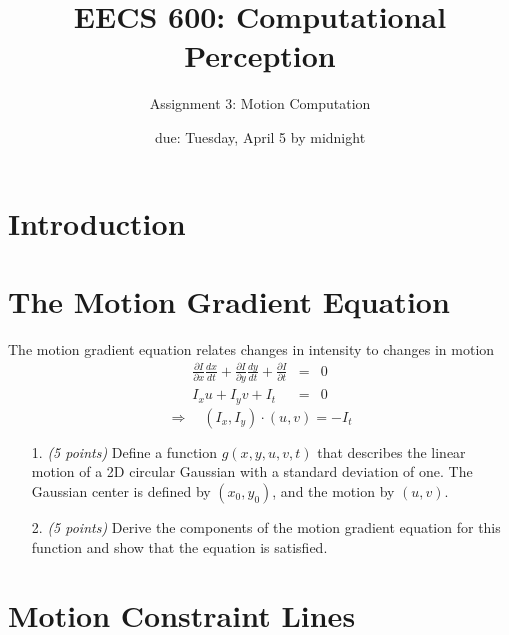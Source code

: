 \documentclass[11pt]{article}
\begin{document}
\title{EECS 600: Computational Perception}
\author{\Large Assignment 3: Motion Computation}

\date{due: Tuesday, April 5 by midnight}

\maketitle

\section*{Introduction}


\section{The Motion Gradient Equation}

\newcommand{\fdxdy}[2]{\frac{\partial #1}{\partial #2}}

The motion gradient equation relates changes in intensity to changes in motion
\begin{eqnarray*}
\fdxdy{I}{x}\frac{dx}{dt} + 
\fdxdy{I}{y}\frac{dy}{dt} + 
\fdxdy{I}{t} & = & 0\\
I_x u + I_y v + I_t & = & 0
\end{eqnarray*}
\begin{equation}
\Rightarrow \quad (I_x, I_y) \cdot (u,v) = -I_t
\end{equation}

\begin{itemize}
\item[1.] \emph{(5 points)} Define a function $g(x,y,u,v,t)$ that describes the linear motion of a 2D circular Gaussian with a standard deviation of one.  The Gaussian center is defined by $(x_0,y_0)$, and the motion by $(u,v)$.

\item[2.] \emph{(5 points)} Derive the components of the motion gradient equation for this function and show that the equation is satisfied.

\end{itemize}
\pagebreak
\section{Motion Constraint Lines}
\end{document}

